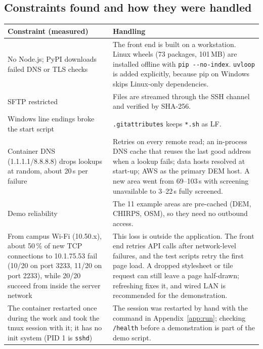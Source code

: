 \documentclass[11pt,a4paper]{article}
\newcommand{\code}[1]{\texttt{#1}}
\begin{document}
\subsection{Constraints found and how they were handled}
\begin{tabularx}{\linewidth}{@{}L{42mm}Y@{}}
\toprule
\textbf{Constraint (measured)} & \textbf{Handling}\\
\midrule
No Node.js; PyPI downloads failed DNS or TLS checks & The front end is built on a workstation. Linux wheels (73 packages, 101\,MB) are installed offline with \code{pip -{}-no-index}. \code{uvloop} is added explicitly, because pip on Windows skips Linux-only dependencies.\\
SFTP restricted & Files are streamed through the SSH channel and verified by SHA-256.\\
Windows line endings broke the start script & \code{.gitattributes} keeps \code{*.sh} as LF.\\
Container DNS (1.1.1.1/8.8.8.8) drops lookups at random, about 20\,s per failure & Retries on every remote read; an in-process DNS cache that reuses the last good address when a lookup fails; data hosts resolved at start-up; AWS as the primary DEM host. A new area went from 69--103\,s with screening unavailable to 3--22\,s fully screened.\\
Demo reliability & The 11 example areas are pre-cached (DEM, CHIRPS, OSM), so they need no outbound access.\\
From campus Wi-Fi (10.50.x), about 50\,\% of new TCP connections to 10.1.75.53 fail (10/20 on port 3233, 11/20 on port 2233), while 20/20 succeed from inside the server network & This loss is outside the application. The front end retries API calls after network-level failures, and the test scripts retry the first page load. A dropped stylesheet or tile request can still leave a page half-drawn; refreshing fixes it, and wired LAN is recommended for the demonstration.\\
The container restarted once during the work and took the tmux session with it; it has no init system (PID 1 is \code{sshd}) & The session was restarted by hand with the command in Appendix~\ref{app:run}; checking \code{/health} before a demonstration is part of the demo script.\\
\bottomrule
\end{tabularx}

\end{document}
